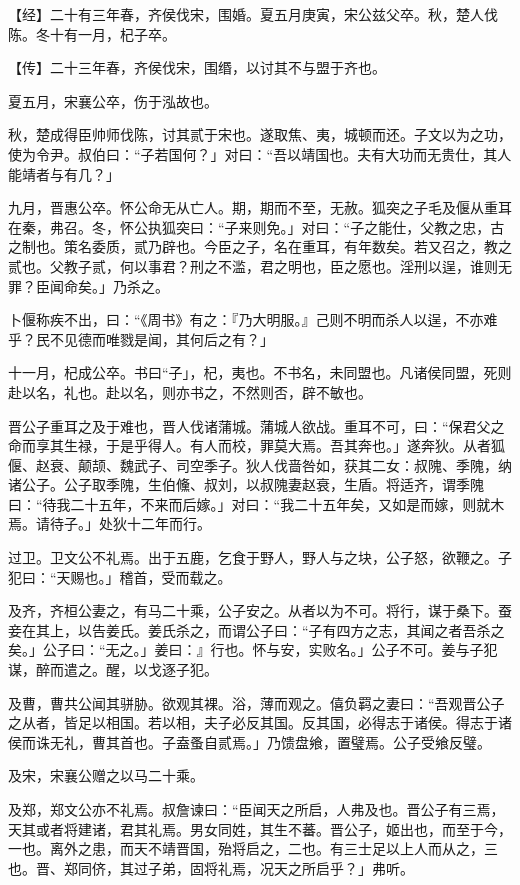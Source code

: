 \documentclass[]{article}
\begin{document}
【经】二十有三年春，齐侯伐宋，围婚。夏五月庚寅，宋公兹父卒。秋，楚人伐陈。冬十有一月，杞子卒。

【传】二十三年春，齐侯伐宋，围缗，以讨其不与盟于齐也。

夏五月，宋襄公卒，伤于泓故也。

秋，楚成得臣帅师伐陈，讨其贰于宋也。遂取焦、夷，城顿而还。子文以为之功，使为令尹。叔伯曰：``子若国何？」对曰：``吾以靖国也。夫有大功而无贵仕，其人能靖者与有几？」

九月，晋惠公卒。怀公命无从亡人。期，期而不至，无赦。狐突之子毛及偃从重耳在秦，弗召。冬，怀公执狐突曰：``子来则免。」对曰：``子之能仕，父教之忠，古之制也。策名委质，贰乃辟也。今臣之子，名在重耳，有年数矣。若又召之，教之贰也。父教子贰，何以事君？刑之不滥，君之明也，臣之愿也。淫刑以逞，谁则无罪？臣闻命矣。」乃杀之。

卜偃称疾不出，曰：``《周书》有之：『乃大明服。』己则不明而杀人以逞，不亦难乎？民不见德而唯戮是闻，其何后之有？」

十一月，杞成公卒。书曰``子」，杞，夷也。不书名，未同盟也。凡诸侯同盟，死则赴以名，礼也。赴以名，则亦书之，不然则否，辟不敏也。

晋公子重耳之及于难也，晋人伐诸蒲城。蒲城人欲战。重耳不可，曰：``保君父之命而享其生禄，于是乎得人。有人而校，罪莫大焉。吾其奔也。」遂奔狄。从者狐偃、赵衰、颠颉、魏武子、司空季子。狄人伐啬咎如，获其二女：叔隗、季隗，纳诸公子。公子取季隗，生伯儵、叔刘，以叔隗妻赵衰，生盾。将适齐，谓季隗曰：``待我二十五年，不来而后嫁。」对曰：``我二十五年矣，又如是而嫁，则就木焉。请待子。」处狄十二年而行。

过卫。卫文公不礼焉。出于五鹿，乞食于野人，野人与之块，公子怒，欲鞭之。子犯曰：``天赐也。」稽首，受而载之。

及齐，齐桓公妻之，有马二十乘，公子安之。从者以为不可。将行，谋于桑下。蚕妾在其上，以告姜氏。姜氏杀之，而谓公子曰：``子有四方之志，其闻之者吾杀之矣。」公子曰：``无之。」姜曰：』行也。怀与安，实败名。」公子不可。姜与子犯谋，醉而遣之。醒，以戈逐子犯。

及曹，曹共公闻其骈胁。欲观其裸。浴，薄而观之。僖负羁之妻曰：``吾观晋公子之从者，皆足以相国。若以相，夫子必反其国。反其国，必得志于诸侯。得志于诸侯而诛无礼，曹其首也。子盍蚤自贰焉。」乃馈盘飨，置璧焉。公子受飨反璧。

及宋，宋襄公赠之以马二十乘。

及郑，郑文公亦不礼焉。叔詹谏曰：``臣闻天之所启，人弗及也。晋公子有三焉，天其或者将建诸，君其礼焉。男女同姓，其生不蕃。晋公子，姬出也，而至于今，一也。离外之患，而天不靖晋国，殆将启之，二也。有三士足以上人而从之，三也。晋、郑同侪，其过子弟，固将礼焉，况天之所启乎？」弗听。
\end{document}
